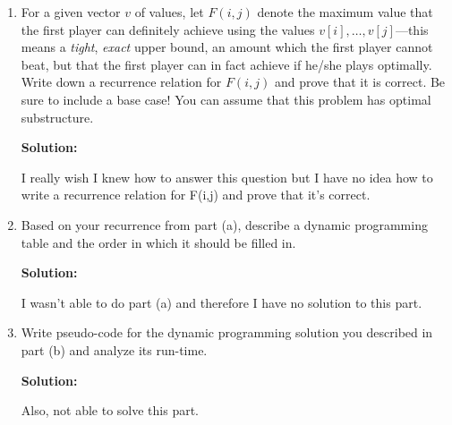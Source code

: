 \documentclass{article}
\begin{document}
\begin{enumerate}
	\begin{enumerate}
	\item For a given vector $v$ of values, let $F(i,j)$ denote the maximum value that the first player can definitely achieve using the values $v[i], \dotsc, v[j]$---this means a \emph{tight}, \emph{exact} upper bound, an amount which the first player cannot beat, but that the first player can in fact achieve if he/she plays optimally. Write down a recurrence relation for $F(i,j)$ and prove that it is correct. Be sure to include a base case!  You can assume that this problem has optimal substructure.\par
	\textbf{Solution:}\par
	I really wish I knew how to answer this question but I have no idea how to write a recurrence relation for F(i,j) and prove that it's correct.\par
	\item Based on your recurrence from part (a), describe a dynamic programming table and the order in which it should be filled in.\par
	\textbf{Solution:}\par
	I wasn't able to do part (a) and therefore I have no solution to this part. \par	
	\item Write pseudo-code for the dynamic programming solution you described in part (b) and analyze its run-time.\par
	\textbf{Solution:}\par
	Also, not able to solve this part. 
	\end{enumerate}

\end{enumerate}
\end{document}
